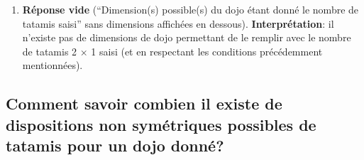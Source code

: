 \begin{enumerate}
\begin{enumerate}
              \item \textbf{Réponse vide} (“Dimension(s) possible(s) du dojo étant donné le nombre de tatamis saisi”
                    sans dimensions affichées en dessous). \textbf{Interprétation}: il n’existe pas de dimensions de dojo
                    permettant de le remplir avec le nombre de tatamis 2 $\times$ 1 saisi (et en respectant les conditions précédemment mentionnées).

          \end{enumerate}

\end{enumerate}

\subsection{Comment savoir combien il existe de dispositions non symétriques possibles de tatamis pour un dojo donné?}

